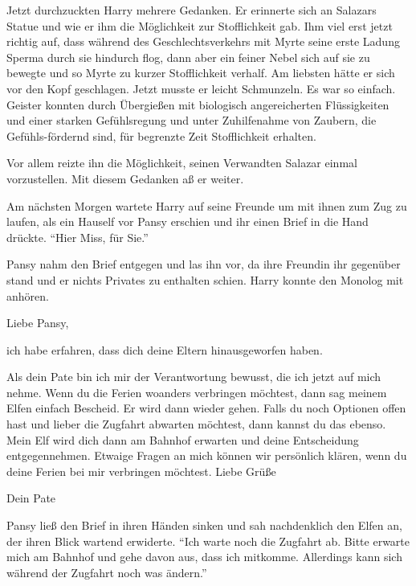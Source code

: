 Jetzt durchzuckten Harry mehrere Gedanken. Er erinnerte sich an Salazars Statue und wie er ihm die Möglichkeit zur Stofflichkeit gab. Ihm viel erst jetzt richtig auf, dass während des Geschlechtsverkehrs mit Myrte seine erste Ladung Sperma durch sie hindurch flog, dann aber ein feiner Nebel sich auf sie zu bewegte und so Myrte zu kurzer Stofflichkeit verhalf.  Am liebsten hätte er sich vor den Kopf geschlagen. Jetzt musste er leicht Schmunzeln. Es war so einfach. Geister konnten durch Übergießen mit biologisch angereicherten Flüssigkeiten und einer starken Gefühlsregung und unter Zuhilfenahme von Zaubern, die Gefühls-fördernd sind, für begrenzte Zeit Stofflichkeit erhalten.

Vor allem reizte ihn die Möglichkeit, seinen Verwandten Salazar einmal vorzustellen. Mit diesem Gedanken aß er weiter.

\trenn

Am nächsten Morgen wartete Harry auf seine Freunde um mit ihnen zum Zug zu laufen, als ein Hauself vor Pansy erschien und ihr einen Brief in die Hand drückte. \enquote{Hier Miss, für Sie.}

Pansy nahm den Brief entgegen und las ihn vor, da ihre Freundin ihr gegenüber stand und er nichts Privates zu enthalten schien. Harry konnte den Monolog mit anhören.

\begin{brief}
Liebe Pansy,

ich habe erfahren, dass dich deine Eltern hinausgeworfen haben.

Als dein Pate bin ich mir der Verantwortung bewusst, die ich jetzt auf mich nehme. Wenn du die Ferien woanders verbringen möchtest, dann sag meinem Elfen einfach Bescheid. Er wird dann wieder gehen. Falls du noch Optionen offen hast und lieber die Zugfahrt abwarten möchtest, dann kannst du das ebenso. Mein Elf wird dich dann am Bahnhof erwarten und deine Entscheidung entgegennehmen. Etwaige Fragen an mich können wir persönlich klären, wenn du deine Ferien bei mir verbringen möchtest.
\signumspace
Liebe Grüße

Dein Pate
\end{brief}

Pansy ließ den Brief in ihren Händen sinken und sah nachdenklich den Elfen an, der ihren Blick wartend erwiderte.  \enquote{Ich warte noch die Zugfahrt ab. Bitte erwarte mich am Bahnhof und gehe davon aus, dass ich mitkomme. Allerdings kann sich während der Zugfahrt noch was ändern.}

